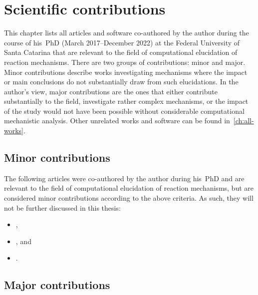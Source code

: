 \chapter{Scientific contributions}
\label{ch:contributions}

This chapter lists all articles and software co-authored by the author during
the course of his~PhD (March 2017--December 2022) at the Federal University of
Santa Catarina that are relevant to the field of computational elucidation of
reaction mechanisms.
There are two groups of contributions: minor and major.
Minor contributions describe works investigating mechanisms where the impact or
main conclusions do not substantially draw from such elucidations. In the
author's view, major contributions are the ones that either contribute
substantially to the field, investigate rather complex mechanisms, or the
impact of the study would not have been possible without considerable
computational mechanistic analysis.
Other unrelated works and software can be found in~\cref{ch:all-works}.

\section{Minor contributions}%
\label{sec:minor-contributions}

The following articles were co-authored by the author during his~PhD
and are relevant to the field of computational elucidation of reaction
mechanisms, but are considered minor contributions according to the above criteria.
As such, they will not be further discussed in this thesis:
%
\begin{itemize}
	\item {},
	\item {}, and
	\item {}.
\end{itemize}

\section{Major contributions}%
\label{sec:major-contributions}

